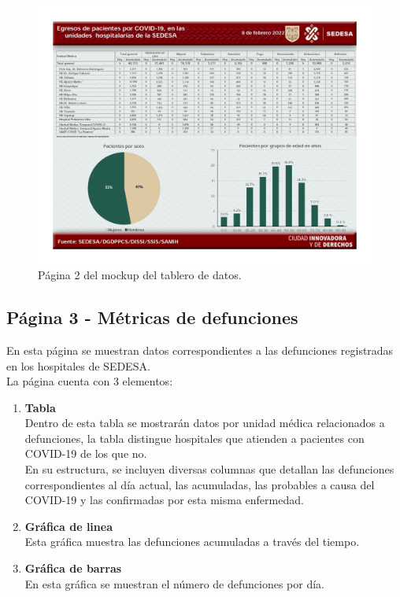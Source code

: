 \begin{figure}[H]
        \centering
        \includegraphics[width=\textwidth]{images/mockup_2.jpg}
        \caption{Página 2 del mockup del tablero de datos.} \label{fig:mock_pag2}
\end{figure}

\subsection{Página 3 - Métricas de defunciones}

En esta página se muestran datos correspondientes a las defunciones registradas en los hospitales de SEDESA.\\

La página cuenta con 3 elementos:

\begin{enumerate}
    \item \textbf{Tabla}\\
    Dentro de esta tabla se mostrarán datos por unidad médica relacionados a defunciones, la tabla distingue hospitales que atienden a pacientes con COVID-19 de los que no.\\
    En su estructura, se incluyen diversas columnas que detallan las defunciones correspondientes al día actual, las acumuladas, las probables a causa del COVID-19 y las confirmadas por esta misma enfermedad.

    \item \textbf{Gráfica de linea}\\
    Esta gráfica muestra las defunciones acumuladas a través del tiempo.

    \item \textbf{Gráfica de barras}\\
    En esta gráfica se muestran el número de defunciones por día.
    
\end{enumerate}

